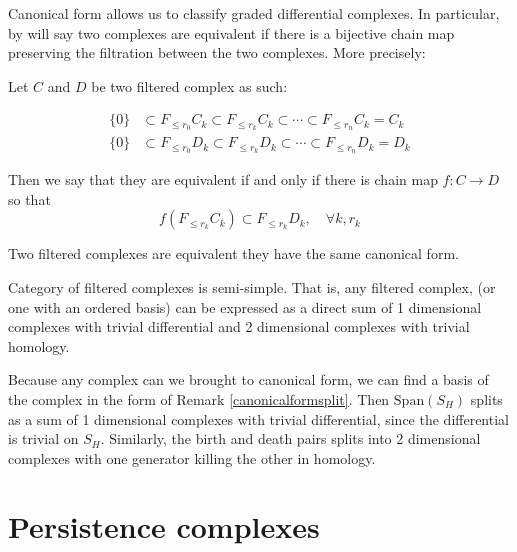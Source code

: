 Canonical form allows us to classify graded differential complexes.
In particular, by will say two complexes are equivalent if
there is a bijective chain map
preserving the filtration between the two complexes.
More precisely:

\begin{definition}
Let $C$ and $D$ be two filtered complex as such:

\begin{align*}
\{0\}
&\subset
F_{\leq r_0}C_k
\subset
F_{\leq r_k}C_k
\subset
\cdots
\subset
F_{\leq r_n}C_k
=
C_k
\\
\{0\}
&\subset
F_{\leq r_0}D_k
\subset
F_{\leq r_k}D_k
\subset
\cdots
\subset
F_{\leq r_n}D_k
=
D_k
\end{align*}

Then we say that they are equivalent if and only if
there is chain map $f:C \to D$ so that
$$
f\left(
F_{\leq r_k}C_k
\right)
\subset
F_{\leq r_k}D_k, \quad\forall k,r_k
$$

\end{definition}

\begin{corollary}
Two filtered complexes are equivalent
\ifff they have the same canonical form.
\end{corollary}


\begin{corollary}{Category of filtered complexes is semi-simple.}
That is, any filtered complex, (or one with an ordered basis) can be expressed as a direct sum of 
1 dimensional complexes with trivial differential and 2 dimensional complexes with trivial homology.
\end{corollary}

\begin{prof}
Because any complex can we brought to canonical form, we can find a basis of the complex in the form of Remark \ref{canonicalformsplit}.
Then $\text{Span}(S_H)$ splits as a sum of 1 dimensional complexes with trivial differential, since the differential is trivial on $S_H$.
Similarly, the birth and death pairs splits into 2 dimensional complexes with one generator killing the other in homology.

\end{prof}


\section{Persistence complexes}

